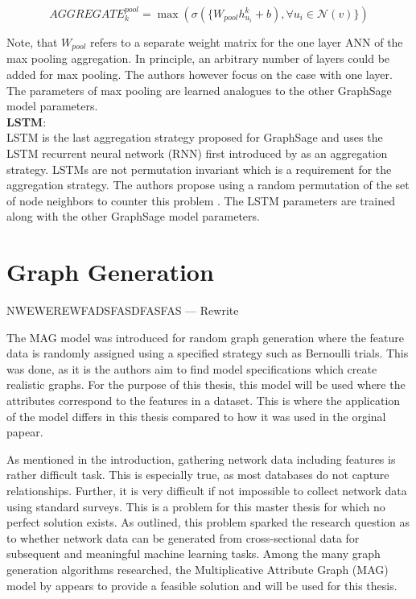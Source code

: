 	\begin{equation}
		AGGREGATE_{k}^{pool} = \max\left(\sigma(\{W_{pool}h_{u_{i}}^{k} +
		b),\forall u_{i} \in \mathcal{N}(v)\}\right)
	\end{equation}

	\noindent Note, that $W_{pool}$ refers to a separate weight matrix for the 
	one layer ANN of the max pooling aggregation. In principle, an arbitrary 
	number of layers could be added for max pooling. The authors 
	\cite{hamilton2017inductive} however focus on the case with one layer. The
	parameters of max pooling are learned analogues to the other GraphSage
	model parameters. \\ 

	\noindent\textbf{LSTM}:\\
	\noindent LSTM is the last aggregation strategy proposed for GraphSage and
	uses the LSTM recurrent neural network (RNN) first introduced by
	\cite{hochreiter1997long} as an aggregation strategy. LSTMs are not
	permutation invariant which is a requirement for the aggregation strategy.
	The authors propose using a random permutation of the set of node neighbors 
	to counter this problem \citep[p. 5]{hamilton2017inductive}. The LSTM
	parameters are trained along with the other GraphSage model parameters.  

	\section{Graph Generation}


NWEWEREWFADSFASDFASFAS --- Rewrite

	The MAG model was introduced for
	random graph generation where the feature data is randomly assigned using a
	specified strategy such as Bernoulli trials. This was done, as it is the
	authors aim to find model specifications which create realistic graphs. For
	the purpose of this thesis, this model will be used where the attributes
	correspond to the features in a dataset. This is where the application of
	the model differs in this thesis compared to how it was used in the orginal
	papear. 


	\noindent As mentioned in the introduction, gathering network data
	including features is rather difficult task. This is especially true, as
	most databases do not capture relationships. Further, it is very difficult
	if not impossible to collect network data using standard surveys. This is a 
	problem for this master thesis for which no perfect solution exists. As
	outlined, this problem sparked the research question as to whether network
	data can be generated from cross-sectional data for subsequent and
	meaningful machine learning tasks. Among the many graph generation 
	algorithms researched, the Multiplicative Attribute Graph (MAG) model by 
	\cite{kim2012multiplicative} appears to provide a feasible solution and
	will be used for this thesis. \\

